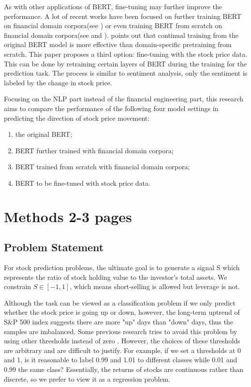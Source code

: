 \documentclass[11pt]{article}
\begin{document}
As with other applications of BERT, fine-tuning may further improve the performance. A lot of recent works have been focused on further training BERT on financial domain corpora(see \citet{araci2019finbert}) or even training BERT from scratch on financial domain corpora(see \citet{yang2020finbert} and \citet{ijcai2020p622}). \citet{peng-etal-2021-domain} points out that continual training from the original BERT model is more effective than domain-specific pretraining from scratch. This paper proposes a third option: fine-tuning with the stock price data. This can be done by retraining certain layers of BERT during the training for the prediction task. The process is similar to sentiment analysis, only the sentiment is labeled by the change in stock price.

Focusing on the NLP part instead of the financial engineering part, this research aims to compare the performance of the following four model settings in predicting the direction of stock price movement:
\begin{enumerate}
    \item the original BERT;
    \item BERT further trained with financial domain corpora;
    \item BERT trained from scratch with financial domain corpora;
    \item BERT to be fine-tuned with stock price data.
\end{enumerate}


\section{Methods 2-3 pages}

\subsection{Problem Statement}

For stock prediction problems, the ultimate goal is to generate a signal S which represents the ratio of stock holding value to the investor's total assets. We constrain $S \in [-1,1]$, which means short-selling is allowed but leverage is not.

Although the task can be viewed as a classification problem if we only predict whether the stock price is going up or down, however, the long-term uptrend of S\&P 500 index suggests there are more "up" days than "down" days, thus the samples are imbalanced. Some previous research tries to avoid this problem by using other thresholds instead of zero \citep{xu-cohen-2018-stock}. However, the choices of these thresholds are arbitrary and are difficult to justify. For example, if we set a thresholds at 0 and 1, is it reasonable to label 0.99 and 1.01 to different classes while 0.01 and 0.99 the same class? Essentially, the returns of stocks are continuous rather than discrete, so we prefer to view it as a regression problem.
\end{document}

